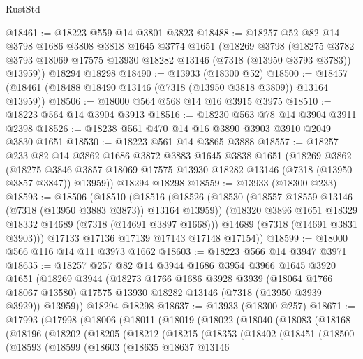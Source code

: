 \begin{lexlean}{RustStd}
\begin{coremodule}
@18461 := @18223 @559 @14 @3801 @3823
@18488 := @18257
    @52
    @82
    @14
    @3798
    @1686
    @3808
    @3818
    @1645
    @3774
    @1651
    (@18269
      @3798
      (@18275 @3782 @3793 @18069 @17575 @13930 @18282 @13146 (@7318 (@13950 @3793 @3783)) @13959))
    @18294
    @18298
@18490 := @13933 (@18300 @52)
@18500 := @18457 (@18461 (@18488 @18490 @13146 (@7318 (@13950 @3818 @3809)) @13164 @13959))
@18506 := @18000 @564 @568 @14 @16 @3915 @3975
@18510 := @18223 @564 @14 @3904 @3913
@18516 := @18230 @563 @78 @14 @3904 @3911 @2398
@18526 := @18238 @561 @470 @14 @16 @3890 @3903 @3910 @2049 @3830 @1651
@18530 := @18223 @561 @14 @3865 @3888
@18557 := @18257
    @233
    @82
    @14
    @3862
    @1686
    @3872
    @3883
    @1645
    @3838
    @1651
    (@18269
      @3862
      (@18275 @3846 @3857 @18069 @17575 @13930 @18282 @13146 (@7318 (@13950 @3857 @3847)) @13959))
    @18294
    @18298
@18559 := @13933 (@18300 @233)
@18593 := @18506
    (@18510
      (@18516
        (@18526
          (@18530 (@18557 @18559 @13146 (@7318 (@13950 @3883 @3873)) @13164 @13959))
          (@18320 @3896 @1651 @18329 @18332 @14689 (@7318 (@14691 @3897 @1668)))
          @14689
          (@7318 (@14691 @3831 @3903)))
        @17133
        @17136
        @17139
        @17143
        @17148
        @17154))
@18599 := @18000 @566 @116 @14 @11 @3973 @1662
@18603 := @18223 @566 @14 @3947 @3971
@18635 := @18257
    @257
    @82
    @14
    @3944
    @1686
    @3954
    @3966
    @1645
    @3920
    @1651
    (@18269
      @3944
      (@18273
        @1766
        @1686
        @3928
        @3939
        (@18064 @1766 @18067 @13580)
        @17575
        @13930
        @18282
        @13146
        (@7318 (@13950 @3939 @3929))
        @13959))
    @18294
    @18298
@18637 := @13933 (@18300 @257)
@18671 := @17993
    (@17998
      (@18006
        (@18011
          (@18019
            (@18022
              (@18040
                (@18083
                  (@18168
                    (@18196
                      (@18202
                        (@18205
                          (@18212
                            (@18215
                              (@18353
                                (@18402
                                  (@18451
                                    (@18500
                                      (@18593
                                        (@18599
                                          (@18603
                                            (@18635
                                              @18637
                                              @13146

\end{coremodule}
\end{lexlean}
